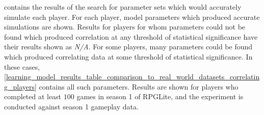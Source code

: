 contains the results of the search for parameter sets which would accurately
simulate each player. For each player, model parameters which produced accurate
simulations are shown. Results for players for whom parameters could not be
found which produced correlation at any threshold of statistical significance
have their results shown as \emph{N/A}. For some players, many parameters could
be found which produced correlating data at some threshold of statistical
significance. In these cases,
\cref{learning_model_results_table_comparison_to_real_world_datasets_correlating_players}
contains all such parameters. Results are shown for players who completed at
least $100$ games in season 1 of RPGLite, and the experiment is conducted
against season 1 gameplay data.


